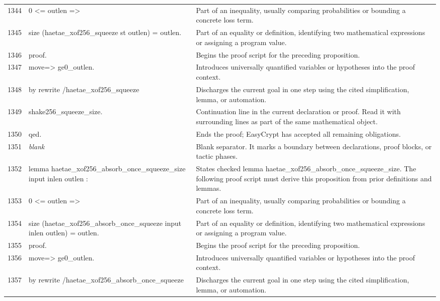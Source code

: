 \documentclass[10pt]{article}
\begin{document}
\begin{longtable}{r L{0.53\textwidth} L{0.37\textwidth}}
1344 & {\ttfamily\scriptsize   0 <= outlen =>} & Part of an inequality, usually comparing probabilities or bounding a concrete loss term. \\
1345 & {\ttfamily\scriptsize   size (haetae\_xof256\_squeeze st outlen) = outlen.} & Part of an equality or definition, identifying two mathematical expressions or assigning a program value. \\
1346 & {\ttfamily\scriptsize proof.} & Begins the proof script for the preceding proposition. \\
1347 & {\ttfamily\scriptsize move=> ge0\_outlen.} & Introduces universally quantified variables or hypotheses into the proof context. \\
1348 & {\ttfamily\scriptsize by rewrite /haetae\_xof256\_squeeze} & Discharges the current goal in one step using the cited simplification, lemma, or automation. \\
1349 & {\ttfamily\scriptsize            shake256\_squeeze\_size.} & Continuation line in the current declaration or proof.  Read it with surrounding lines as part of the same mathematical object. \\
1350 & {\ttfamily\scriptsize qed.} & Ends the proof; EasyCrypt has accepted all remaining obligations. \\
1351 & {\ttfamily\scriptsize \emph{blank}} & Blank separator.  It marks a boundary between declarations, proof blocks, or tactic phases. \\
1352 & {\ttfamily\scriptsize lemma haetae\_xof256\_absorb\_once\_squeeze\_size input inlen outlen :} & States checked lemma haetae\_xof256\_absorb\_once\_squeeze\_size.  The following proof script must derive this proposition from prior definitions and lemmas. \\
1353 & {\ttfamily\scriptsize   0 <= outlen =>} & Part of an inequality, usually comparing probabilities or bounding a concrete loss term. \\
1354 & {\ttfamily\scriptsize   size (haetae\_xof256\_absorb\_once\_squeeze input inlen outlen) = outlen.} & Part of an equality or definition, identifying two mathematical expressions or assigning a program value. \\
1355 & {\ttfamily\scriptsize proof.} & Begins the proof script for the preceding proposition. \\
1356 & {\ttfamily\scriptsize move=> ge0\_outlen.} & Introduces universally quantified variables or hypotheses into the proof context. \\
1357 & {\ttfamily\scriptsize by rewrite /haetae\_xof256\_absorb\_once\_squeeze} & Discharges the current goal in one step using the cited simplification, lemma, or automation. \\

\end{longtable}
\end{document}
